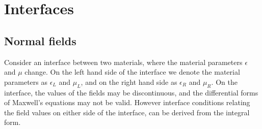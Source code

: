 
\section{Interfaces}

% 



\subsection{Normal fields}

Consider an interface between two materials, where the material parameters $\epsilon$ and $\mu$ change. On the left hand side of the interface we denote the material parameters as $\epsilon_L$ and $\mu_L$, and on the right hand side as $\epsilon_R$ and $\mu_R$. On the interface, the values of the fields may be discontinuous, and the differential forms of Maxwell's equations may not be valid. However interface conditions relating the field values on either side of the interface, can be derived from the integral form.

